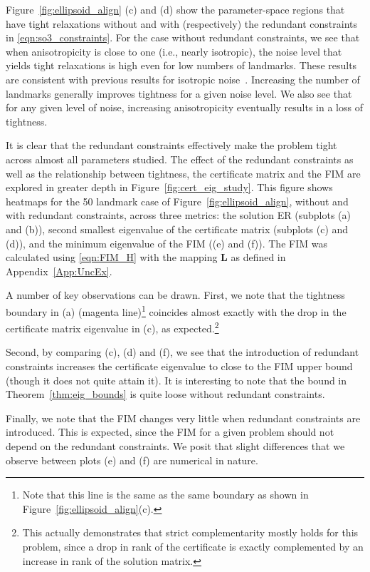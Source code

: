 \documentclass[lettersize,journal]{IEEEtran}
\begin{document}
Figure~\ref{fig:ellipsoid_align} (c) and (d) show the parameter-space regions that have tight relaxations without and with (respectively) the redundant constraints in \eqref{eqn:so3_constraints}. For the case without redundant constraints, we see that when anisotropicity is close to one (i.e., nearly isotropic), the noise level that yields tight relaxations is high even for low numbers of landmarks. These results are consistent with previous results for isotropic noise~\cite{holmesEfficientGlobalOptimality2023}. Increasing the number of landmarks generally improves tightness for a given noise level. We also see that for any given level of noise, increasing anisotropicity eventually results in a loss of tightness. 

It is clear that the redundant constraints effectively make the problem tight across almost all parameters studied. The effect of the redundant constraints as well as the relationship between tightness, the certificate matrix and the FIM are explored in greater depth in Figure~\ref{fig:cert_eig_study}. This figure shows heatmaps for the 50 landmark case of Figure~\ref{fig:ellipsoid_align}, without and with redundant constraints, across three metrics: the solution ER (subplots (a) and (b)), second smallest eigenvalue of the certificate matrix (subplots (c) and (d)), and the minimum eigenvalue of the FIM ((e) and (f)). The FIM was calculated using \eqref{eqn:FIM_H} with the mapping $\bm{L}$ as defined in  Appendix~\ref{App:UncEx}. 

A number of key observations can be drawn. First, we note that the tightness boundary in (a) (magenta line)\footnote{Note that this line is the same as the same boundary as shown in Figure~\ref{fig:ellipsoid_align}(c).} coincides almost exactly with the drop in the certificate matrix eigenvalue in (c), as expected.\footnote{This actually demonstrates that strict complementarity mostly holds for this problem, since a drop in rank of the certificate is exactly complemented by an increase in rank of the solution matrix.} 

Second, by comparing (c), (d) and (f), we see that the introduction of redundant constraints increases the certificate eigenvalue to close to the FIM upper bound (though it does not quite attain it). It is interesting to note that the bound in Theorem~\ref{thm:eig_bounds} is quite loose without redundant constraints. 

Finally, we note that the FIM changes very little when redundant constraints are introduced. This is expected, since the FIM for a given problem should not depend on the redundant constraints. We posit that slight differences that we observe between plots (e) and (f) are numerical in nature. 
\end{document}
